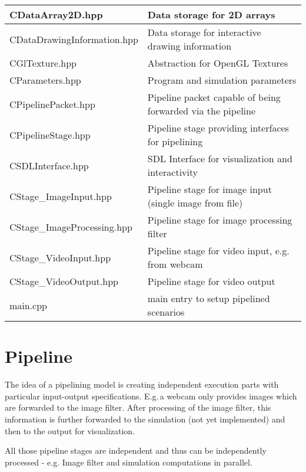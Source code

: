 \documentclass[11pt,a4paper]{article}
\begin{document}
\noindent
\begin{tabular}{|l|l|}
	\hline
	CDataArray2D.hpp				&
		Data storage for 2D arrays							\\
	\hline
	CDataDrawingInformation.hpp		&
		Data storage for interactive drawing information	\\
	\hline
	CGlTexture.hpp					&
		Abstraction for OpenGL Textures						\\
	\hline
	CParameters.hpp					&
		Program and simulation parameters					\\
	\hline
	CPipelinePacket.hpp				&
		Pipeline packet capable of being forwarded via the pipeline	\\
	\hline
	CPipelineStage.hpp				&
		Pipeline stage providing interfaces for pipelining	\\
	\hline
	CSDLInterface.hpp				&
		SDL Interface for visualization and interactivity	\\
	\hline
	CStage\_ImageInput.hpp			&
		Pipeline stage for image input (single image from file)	\\
	\hline
	CStage\_ImageProcessing.hpp		&
		Pipeline stage for image processing filter			\\
	\hline
	CStage\_VideoInput.hpp			&
		Pipeline stage for video input, e.g.\,from webcam	\\
	\hline
	CStage\_VideoOutput.hpp			&
		Pipeline stage for video output				\\			
	\hline
	main.cpp						&
		main entry to setup pipelined scenarios		\\
	\hline
\end{tabular}


\section{Pipeline}
\label{sec:pipeline}

The idea of a pipelining model is creating independent execution parts with
particular input-output specifications.
E.g.\,a webcam only provides images which are forwarded to the image filter.
After processing of the image filter, this information is further forwarded to
the simulation (not yet implemented) and then to the output for visualization.

All those pipeline stages are independent and thus can be independently
processed - e.g. Image filter and simulation computations in parallel.
\end{document}
